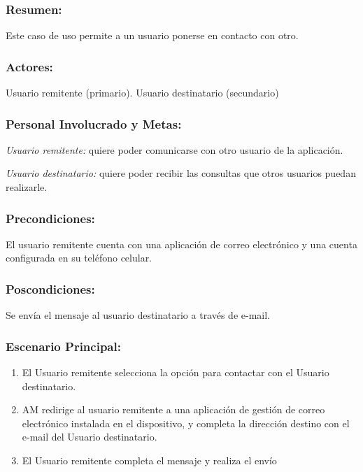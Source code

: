 \begin{framed}

\subsubsection{Resumen:}Este caso de uso permite a un usuario ponerse en contacto con otro.


\subsubsection{Actores:} Usuario remitente (primario). Usuario destinatario (secundario)

\subsubsection{Personal Involucrado y Metas:}

\emph{Usuario remitente:} quiere poder comunicarse con otro usuario de la aplicación.

\emph{Usuario destinatario:} quiere poder recibir las consultas que otros usuarios puedan realizarle. 


\subsubsection{Precondiciones:} 
El usuario remitente cuenta con una aplicación de correo electrónico y una cuenta configurada en su teléfono celular.

\subsubsection{Poscondiciones:} 
Se envía el mensaje al usuario destinatario a través de e-mail.

\subsubsection{Escenario Principal: }

\begin{enumerate}
    \item El Usuario remitente selecciona la opción para contactar con el Usuario destinatario.
    \item AM redirige al usuario remitente a una aplicación de gestión de correo electrónico instalada en el dispositivo, y completa la dirección destino con el e-mail del Usuario destinatario.
    \item El Usuario remitente completa el mensaje y realiza el envío
        
\end{enumerate}

\end{framed}

